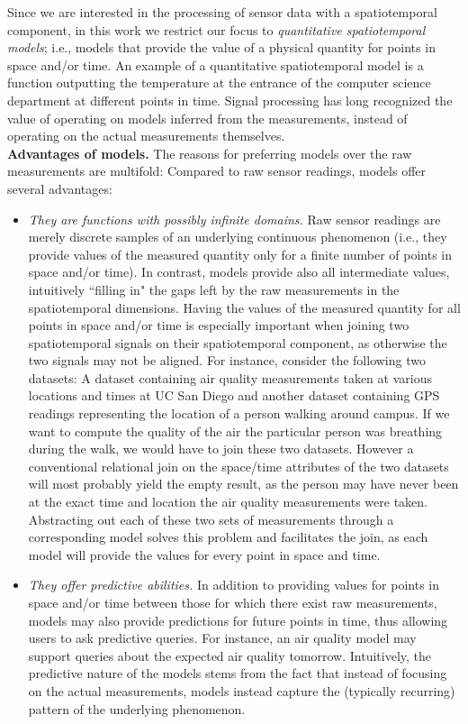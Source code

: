 Since we are interested in the processing of sensor data with a spatiotemporal component, in this work we restrict our focus to \emph{quantitative spatiotemporal models}; i.e., models that provide the value of a physical quantity for points in space and/or time. An example of a quantitative spatiotemporal model is a function outputting the temperature at the entrance of the computer science department at different points in time. Signal processing has long recognized the value of operating on models inferred from the measurements, instead of operating on the actual measurements themselves.\\

{\bf Advantages of models.} The reasons for preferring models over the raw measurements are multifold: Compared to raw sensor readings, models offer several advantages:
\iffalse
\begin{itemize}
\item \emph{They are functions with possibly infinite domains.} Raw sensor readings are merely discrete samples of an underlying continuous phenomenon (i.e., they provide values of the measured quantity only for a finite number of points in space and/or time). In contrast, models provide also all intermediate values, intuitively ``filling in" the gaps left by the raw measurements in the spatiotemporal dimensions. Having the values of the measured quantity for all points in space and/or time is especially important when joining two spatiotemporal signals on their spatiotemporal component, as otherwise the two signals may not be aligned. For instance, consider the following two datasets: A dataset containing air quality measurements taken at various locations and times at UC San Diego and another dataset containing GPS readings representing the location of a person walking around campus. If we want to compute the quality of the air the particular person was breathing during the walk, we would have to join these two datasets. However a conventional relational join on the space/time attributes of the two datasets will most probably yield the empty result, as the person may have never been at the exact time and location the air quality measurements were taken. Abstracting out each of these two sets of measurements through a corresponding model solves this problem and facilitates the join, as each model will provide the values for every point in space and time.
\item \emph{They offer predictive abilities.} In addition to providing values for points in space and/or time between those for which there exist raw measurements, models may also provide predictions for future points in time, thus allowing users to ask predictive queries. For instance, an air quality model may support queries about the expected air quality tomorrow. Intuitively, the predictive nature of the models stems from the fact that instead of focusing on the actual measurements, models instead capture the (typically recurring) pattern of the underlying phenomenon.

\end{itemize}
